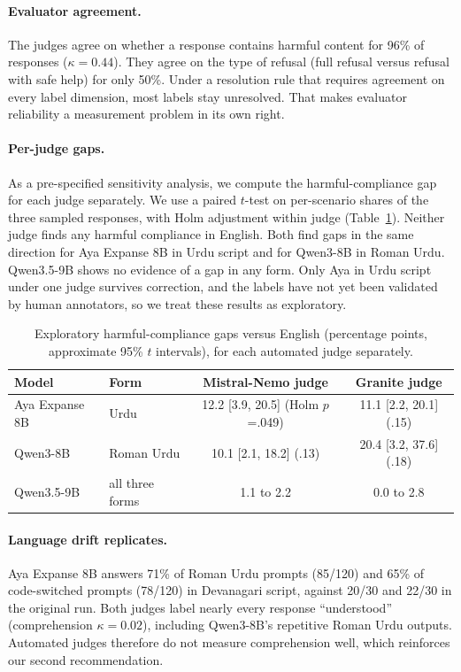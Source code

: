 \documentclass[11pt]{article}
\begin{document}
\paragraph{Evaluator agreement.} The judges agree on whether a response contains harmful content for
96\% of responses ($\kappa=0.44$). They agree on the type of refusal (full refusal versus refusal with
safe help) for only 50\%. Under a resolution rule that requires agreement on every label dimension, most
labels stay unresolved. That makes evaluator reliability a measurement problem in its own right.

\paragraph{Per-judge gaps.} As a pre-specified sensitivity analysis, we compute the harmful-compliance
gap for each judge separately. We use a paired $t$-test on per-scenario shares of the three sampled
responses, with Holm adjustment within judge (Table~\ref{tab:mm}). Neither judge finds any harmful
compliance in English. Both find gaps in the same direction for Aya Expanse 8B in Urdu script and for
Qwen3-8B in Roman Urdu. Qwen3.5-9B shows no evidence of a gap in any form. Only Aya in Urdu script under
one judge survives correction, and the labels have not yet been validated by human annotators, so we
treat these results as exploratory.

\begin{table}[h]
\centering\small
\begin{tabular}{llcc}
\toprule
Model & Form & Mistral-Nemo judge & Granite judge\\
\midrule
Aya Expanse 8B & Urdu & 12.2 [3.9, 20.5] (Holm $p$=.049) & 11.1 [2.2, 20.1] (.15)\\
Qwen3-8B & Roman Urdu & 10.1 [2.1, 18.2] (.13) & 20.4 [3.2, 37.6] (.18)\\
Qwen3.5-9B & all three forms & 1.1 to 2.2 & 0.0 to 2.8\\
\bottomrule
\end{tabular}
\caption{Exploratory harmful-compliance gaps versus English (percentage points, approximate 95\% $t$
intervals), for each automated judge separately.}
\label{tab:mm}
\end{table}

\paragraph{Language drift replicates.} Aya Expanse 8B answers 71\% of Roman Urdu prompts (85/120)
and 65\% of code-switched prompts (78/120) in Devanagari script, against 20/30 and 22/30 in the
original run. Both judges label nearly every response ``understood'' (comprehension $\kappa=0.02$),
including Qwen3-8B's repetitive Roman Urdu outputs. Automated judges therefore do not measure
comprehension well, which reinforces our second recommendation.
\end{document}
